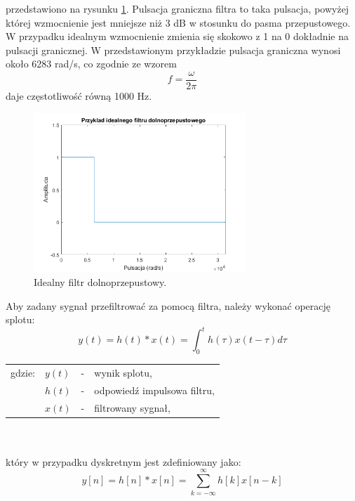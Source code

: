 przedstawiono na rysunku \ref{rys:sub_lowpass}. Pulsacja graniczna filtra to taka pulsacja, powyżej której wzmocnienie jest mniejsze niż 3 dB w stosunku do pasma przepustowego. W przypadku idealnym wzmocnienie zmienia się skokowo z 1 na 0 dokładnie na pulsacji granicznej. W przedstawionym przykładzie pulsacja graniczna wynosi około 6283 rad/s, co zgodnie ze wzorem
\begin{equation} \label{equ:sub_frequency}
f = \frac{\omega}{2 \pi}
\end{equation}
daje częstotliwość równą 1000 Hz.
\begin{figure}[H]
	\centering
	\includegraphics[width=8cm]{grafiki/sub_lowpass}
	\captionsetup{justification=centering}
	\caption{Idealny filtr dolnoprzepustowy.}
	\label{rys:sub_lowpass}
\end{figure}

Aby zadany sygnał przefiltrować za pomocą filtra, należy wykonać operację splotu:
\begin{equation} \label{equ:sub_splot}
y(t)= h(t)*x(t) = \int_{0}^{t} h(\tau)x(t-\tau)d\tau
\end{equation}
\begin{tabular}{ l l l l}
	gdzie: & $y(t)$ &  - & wynik splotu, \\
	&	$h(t)$ & - &  odpowiedź impulsowa filtru,\\
	&	$x(t)$ & - &  filtrowany sygnał,\\
	
\end{tabular} \\ \\
który w przypadku dyskretnym jest zdefiniowany jako:
\begin{equation} \label{equ:sub_splot_dyskretny}
y[n]= h[n]*x[n] = \sum_{k=-\infty}^{\infty} h[k]x[n-k]
\end{equation}

